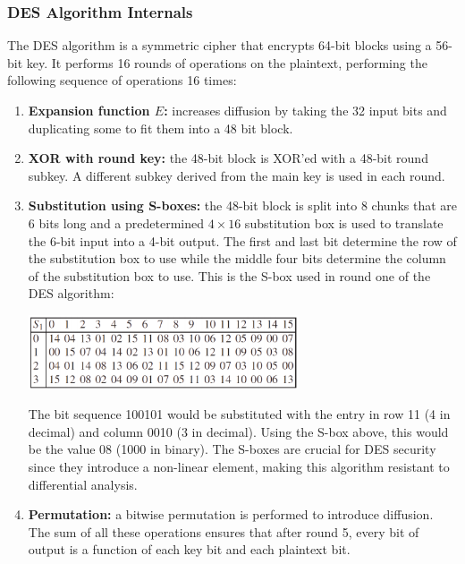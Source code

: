 \documentclass{math}
\begin{document}
\subsubsection*{DES Algorithm Internals}
The DES algorithm is a symmetric cipher that encrypts 64-bit blocks using a
56-bit key. It performs 16 rounds of operations on the plaintext, performing
the following sequence of operations 16 times:
\begin{enumerate}
  \item \textbf{Expansion function \( E \):} increases diffusion by taking the
  32 input bits and duplicating some to fit them into a 48 bit block.
  \item \textbf{XOR with round key:} the 48-bit block is XOR'ed with a 48-bit
  round subkey. A different subkey derived from the main key is used in each
  round.
  \item \textbf{Substitution using S-boxes:} the 48-bit block is split into 8
  chunks that are 6 bits long and a predetermined \( 4\times16 \) substitution
  box is used to translate the 6-bit input into a 4-bit output. The first and
  last bit determine the row of the substitution box to use while the middle
  four bits determine the column of the substitution box to use. This is the
  S-box used in round one of the DES algorithm:
  \begin{center}
    \includegraphics[width=8cm]{assets/sbox.png}
  \end{center}
  The bit sequence 100101 would be substituted with the entry in row 11 (4 in
  decimal) and column 0010 (3 in decimal). Using the S-box above, this would be
  the value 08 (1000 in binary). The S-boxes are crucial for DES security since
  they introduce a non-linear element, making this algorithm resistant to
  differential analysis.
  \item \textbf{Permutation:} a bitwise permutation is performed to introduce
  diffusion. The sum of all these operations ensures that after round 5, every
  bit of output is a function of each key bit and each plaintext bit.
\end{enumerate}
\end{document}
